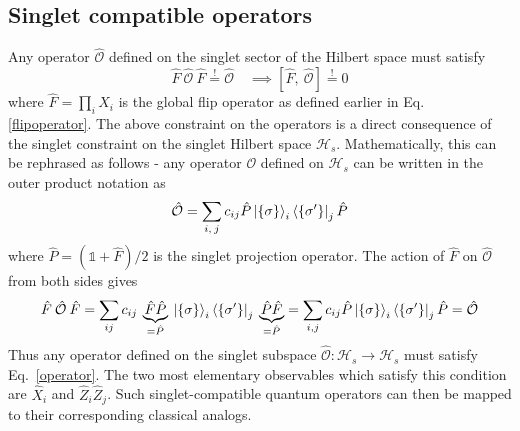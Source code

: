 \documentclass[../thesis_main.tex]{subfiles}
\begin{document}
\subsection{Singlet compatible operators}
Any operator $\hat{\mathcal{O}}$ defined on the singlet sector of the Hilbert space must satisfy 
\begin{equation}
    \hat{F} \: \hat{\mathcal{O}} \: \hat{F} \stackrel{!}{=} \hat{\mathcal{O}} \quad \implies [\hat{F}, \: \hat{\mathcal{O}}] \stackrel{!}{=} 0
    \label{operator}
\end{equation}
where $\hat{F} = \prod_i \hat{X}_i$ is the global flip operator as defined earlier in Eq. \ref{flipoperator}. The above constraint on the operators is a direct consequence of the singlet constraint on the singlet Hilbert space $\mathcal{H}_s$. Mathematically, this can be rephrased as follows - any operator $\mathcal{O}$ defined on $\mathcal{H}_s$ can be written in the outer product notation as 
\begin{equation}
    \hat{\mathcal{O}} = \sum_{i,\:j} c_{ij} \hat{P}\ket{\{\sigma\}}_i \bra{\{\sigma '\}}_j \hat{P}
\end{equation}
where $\hat{P} = (\mathds{1} + \hat{F})/2$ is the singlet projection operator. The action of $\hat{F}$ on $\hat{\mathcal{O}}$ from both sides gives   
\begin{equation}
    \hat{F} \: \hat{\mathcal{O}} \: \hat{F} = \sum_{ij} c_{ij} \: \underbrace{\hat{F}\hat{P}}_{ = \hat{P}} \: \ket{\{\sigma\}}_i \bra{\{\sigma '\}}_j \:\underbrace{\hat{P} \hat{F}}_{ = \hat{P}} = \sum_{i,j} c_{ij} \hat{P}\ket{\{\sigma\}}_i \bra{\{\sigma '\}}_j \hat{P} = \hat{\mathcal{O}}
\end{equation}
Thus any operator defined on the singlet subspace $\hat{\mathcal{O}}: \mathcal{H}_s \to \mathcal{H}_s$ must satisfy  Eq.~\eqref{operator}. The two most elementary observables which satisfy this condition are $\hat{X}_i$ and $\hat{Z}_i \hat{Z}_j$.   Such singlet-compatible quantum operators can then be mapped to their corresponding classical analogs.  
\end{document}
